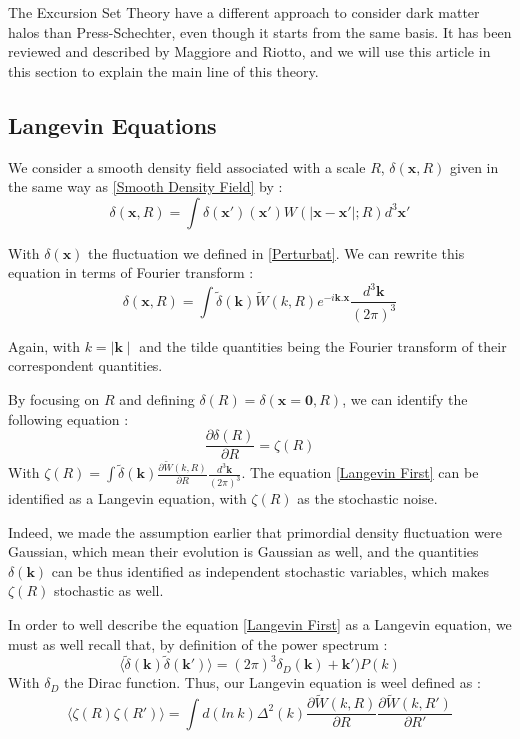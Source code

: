 The Excursion Set Theory\cite{Bond} have a different approach to consider dark matter halos than Press-Schechter, even though it starts from the same basis. It has been reviewed and described by Maggiore and Riotto\cite{Maggiore}, and we will use this article in this section to explain the main line of this theory.

\subsection{Langevin Equations}

We consider a smooth density field associated with a scale $R$, $\delta(\textbf{x},R)$ given in the same way as \ref{Smooth Density Field} by :
\begin{equation}
\label{Smooth Density Field Magg}
\delta (\textbf{x}, R) =  \int \delta (\textbf{x}') (\textbf{x}') W(\mid \textbf{x} - \textbf{x}'\mid ; R) d^3 \textbf{x}'
\end{equation}

With $\delta(\textbf{x})$ the fluctuation we defined in \ref{Perturbat}. We can rewrite this equation in terms of Fourier transform :
\begin{equation}
\label{Fourier Smooth Density}
\delta (\textbf{x}, R) =  \int \widetilde{\delta} (\textbf{k}) \widetilde{W}(k, R) e^{-i\textbf{k}.\textbf{x}} \frac{d^3 \textbf{k}}{(2\pi)^3}
\end{equation}

Again, with $k = \mid \textbf{k} \mid$ and the tilde quantities being the Fourier transform of their correspondent quantities.

By focusing on $R$ and defining $\delta(R) = \delta (\textbf{x}=\textbf{0}, R)$, we can identify the following equation :
\begin{equation}
\label{Langevin First}
\frac{\partial \delta(R)}{\partial R} = \zeta (R)
\end{equation}
With $\zeta(R) = \int \widetilde{\delta} (\textbf{k}) \frac{\partial \widetilde{W}(k, R)}{\partial R} \frac{d^3 \textbf{k}}{(2\pi)^3} $.
The equation \ref{Langevin First} can be identified as a Langevin equation, with $\zeta(R)$  as the stochastic noise.

Indeed, we made the assumption earlier that primordial density fluctuation were Gaussian, which mean their evolution is Gaussian as well, and the quantities $\delta(\textbf{k})$ can be thus identified as independent stochastic variables, which makes $\zeta(R)$ stochastic as well.

In order to well describe the equation \ref{Langevin First} as a Langevin equation, we must as well recall that, by definition of the power spectrum :
\begin{equation}
\langle \widetilde{\delta} (\textbf{k}) \widetilde{\delta} (\textbf{k}') \rangle = (2\pi)^3 \delta_D (\textbf{k}) + \textbf{k}') P(k)
\end{equation}
With $\delta_D$ the Dirac function. Thus, our Langevin equation is weel defined as :
\begin{equation}
\langle \zeta (R) \zeta (R') \rangle = \int d(ln \ k) \Delta^2(k) \frac{\partial \widetilde{W}(k, R)}{\partial R} \frac{\partial \widetilde{W}(k, R')}{\partial R'}
\end{equation}

